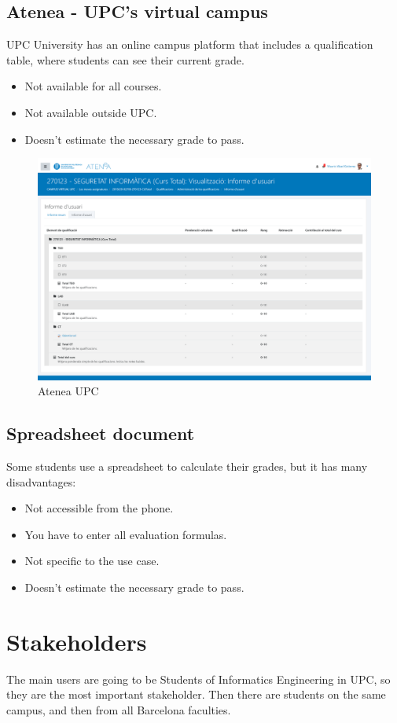 \subsection{Atenea - UPC's virtual campus}
UPC University has an online campus platform that includes a qualification table, where students can see their current grade.
\begin{itemize}
    \setlength\itemsep{-0.5em}
    \item Not available for all courses.
    \item Not available outside UPC.
    \item Doesn't estimate the necessary grade to pass.
\end{itemize}

\begin{figure}[h!]
    \center
    \includegraphics[frame,width=.8\columnwidth]{media/atenea.png}
    \caption[Atenea UPC]{Atenea UPC \cite{atenea}}
    \label{atenea}
\end{figure}

\subsection{Spreadsheet document}
Some students use a spreadsheet to calculate their grades, but it has many disadvantages:
\begin{itemize}
    \setlength\itemsep{-0.5em}
    \item Not accessible from the phone.
    \item You have to enter all evaluation formulas.
    \item Not specific to the use case.
    \item Doesn't estimate the necessary grade to pass.
\end{itemize}

\newpage
\section{Stakeholders}
The main users are going to be Students of Informatics Engineering in UPC, so they are the most important stakeholder. Then there are students on the same campus, and then from all Barcelona faculties.

